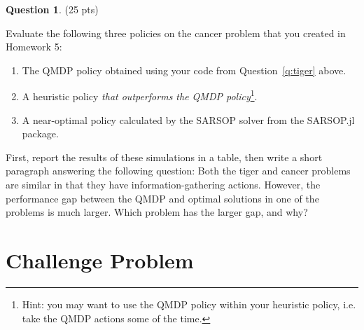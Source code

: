 \documentclass{article}
\theoremstyle{definition}
\newtheorem{question}[thm]{Question}
\begin{document}
\begin{question}
    (25 pts)

    Evaluate the following three policies on the cancer problem that you created in Homework 5:
    \begin{enumerate}[noitemsep]
        \item The QMDP policy obtained using your code from Question~\ref{q:tiger} above.
        \item A heuristic policy \emph{that outperforms the QMDP policy}\footnote{Hint: you may want to use the QMDP policy within your heuristic policy, i.e. take the QMDP actions some of the time.}.
        \item A near-optimal policy calculated by the SARSOP solver from the SARSOP.jl package.
    \end{enumerate}
    First, report the results of these simulations in a table, then write a short paragraph answering the following question: Both the tiger and cancer problems are similar in that they have information-gathering actions. However, the performance gap between the QMDP and optimal solutions in one of the problems is much larger. Which problem has the larger gap, and why?
\end{question}

\section{Challenge Problem}
\end{document}
